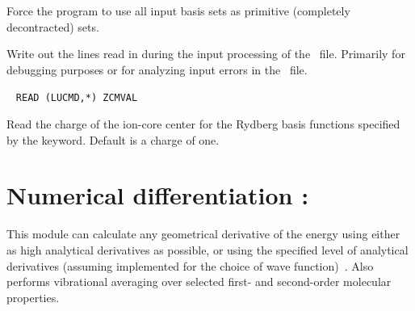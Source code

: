 \begin{description}
Force the program to use all input basis sets as primitive (completely decontracted) sets.

\item[\Key{WRTLIN}]

Write out the lines read in during the input
processing of the \molinp\ file. Primarily for debugging
purposes or for analyzing input errors in the \molinp\ file.

\item[\Key{ZCMVAL}]\verb| |\newline
\verb|READ (LUCMD,*) ZCMVAL|

Read the charge of the ion-core center for the Rydberg basis functions specified
by the  keyword. Default is a charge of one.

\end{description}

\section{Numerical differentiation : }\label{sec:nmddrv}

This module can calculate any geometrical derivative of the energy
using either as high analytical derivatives as possible, or using the
specified level of analytical derivatives (assuming implemented for
the choice of wave function)~\cite{numder}. Also performs vibrational averaging over
selected first- and second-order molecular properties.

